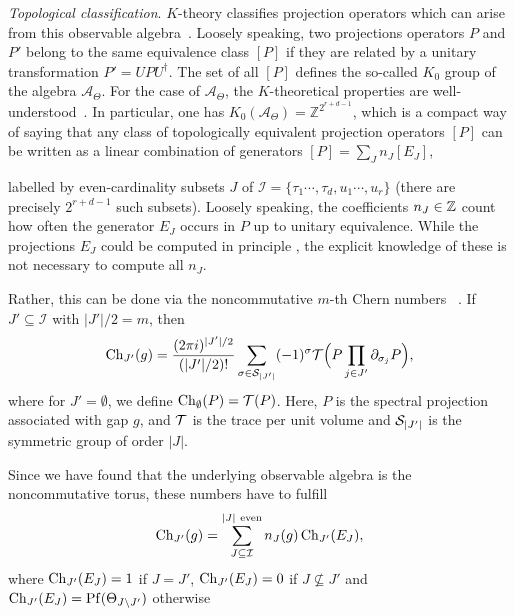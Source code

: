\documentclass[
    10pt,
    aps,
    prr,
    twocolumn,
    floatfix,
    superscriptaddress
]{revtex4-2}
\newcommand{\revise}[1]{{\color{red} #1}}
\begin{document}
\revise{{\it Topological classification}}.
$K$-theory classifies projection operators which can arise from this observable algebra~\cite{Park2008,Blackadar1998, Connes1994}.
Loosely speaking, two projections operators $P$ and $P'$ belong to the same equivalence class $[P]$ if they are related by a unitary transformation $P' = U P U^\dagger $. 
The set of all $[P]$ defines the so-called $K_0$ group of the algebra $\mathcal{A}_\Theta$.
For the case of $\mathcal{A}_\Theta$, the $K$-theoretical properties are well-understood~\cite{Prodan2016}.
In particular, one has $K_0( \mathcal{A}_\Theta) = \mathbb{Z}^{2^{r+d-1}}$, which is a compact way of saying that any class of topologically equivalent projection operators $[P]$ can be written as a linear combination of generators $[P] =\sum_J  n_J [E_J] $, \revise{labelled by even-cardinality subsets $J$ of $\mathcal{I}=\lbrace \tau_1 \cdots, \tau_d, u_1  \cdots, u_r \rbrace$ (there are precisely $2^{r+d-1}$ such subsets).
\revise{
Loosely speaking, the coefficients $n_J \in {\mathbb Z}$ count how often the generator $E_J$ occurs in $P$ up to unitary equivalence.
While the projections $E_J$ could be computed in principle \cite{Rieffel1981}, the explicit knowledge of these is not necessary to compute all $n_J$.}

Rather, this can be done via the noncommutative $m$-th Chern numbers ~\cite{Prodan2013b, Liu2022}.
If $J'\subseteq \mathcal{I}$ with $|J'|/2 = m$, then 
\begin{equation}
    {\rm Ch}_{J'}(g) = \frac{(2\pi i)^{|J'|/2}}{( |J'|/2 )!} \sum_{\sigma \in {\mathcal S}_{|J'|}} (-1)^\sigma {\mathcal T}\Big ( P \prod_{j \in J'} \partial_{\sigma_j}P \Big ) ,
    \label{eq:chern_formula}
\end{equation}
where for $J'= \emptyset$, we define ${\rm Ch}_\emptyset(P) = {\mathcal T}(P)$. Here, $P$ is the spectral projection associated with gap $g$, and ${\mathcal T}$ is the trace per unit volume and ${\mathcal S}_{|J'|}$ is the symmetric group of order $|J|$. }
Since we have found that the underlying observable algebra is the noncommutative torus, these numbers have to fulfill~\cite{Prodan2016}
\begin{equation}
   {\rm Ch}_{J'} (g) =  \sum_{J \subseteq \mathcal{I} }^{|J|~\mathrm{even}}  n_J(g) \, {\rm Ch}_{J'}(E_J),
   \label{eq:chern_expansion}
\end{equation}
where ${\rm Ch}_{J'}(E_J)=1$ if $J=J'$,  ${\rm Ch}_{J'}(E_J)=0$ if $J \not\subseteq J'$ and ${\rm Ch}_{J'}(E_J) = \mathrm{Pf}( \Theta_{J\setminus J'})$ otherwise
\end{document}
